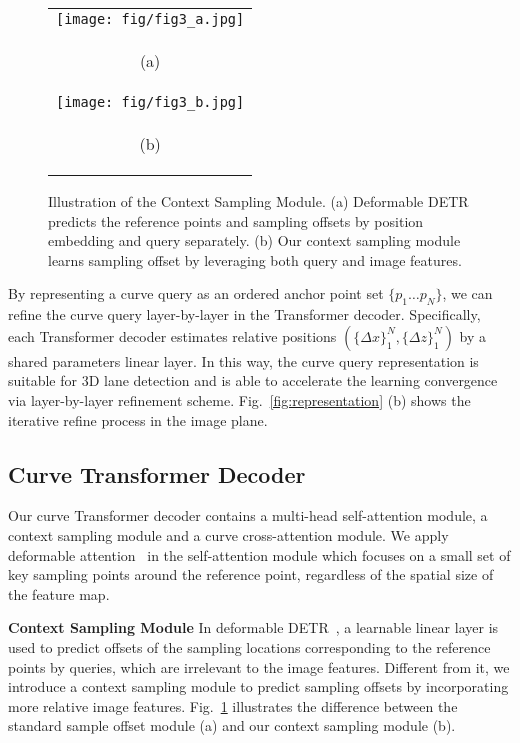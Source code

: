 \documentclass[letterpaper, 10 pt, conference]{ieeeconf}
\begin{document}
\begin{figure}[ht]
\centering
  \begin{tabular}{c}
   \texttt{[image: fig/fig3\_a.jpg]}\\
   \begin{scriptsize}  
   (a)
   \end{scriptsize} \\
   \texttt{[image: fig/fig3\_b.jpg]}\\
   \begin{scriptsize}  
   (b)
   \end{scriptsize}  \\
 \end{tabular}
\caption{Illustration of the Context Sampling Module. (a) Deformable DETR\cite{zhu2020deformable} predicts the reference points and sampling offsets by position embedding and query separately. (b) Our context sampling module learns sampling offset by leveraging both query and image features.}
\label{fig:context-sampling}
\end{figure}

By representing a curve query as an ordered anchor point set $\{p_1 \dots p_N\}$, we can refine the curve query layer-by-layer in the Transformer decoder. Specifically, each Transformer decoder estimates relative positions $(\{\Delta x\}_1^N, \{\Delta z\}_1^N)$ by a shared parameters linear layer. In this way, the curve query representation is suitable for 3D lane detection and is able to accelerate the learning convergence via layer-by-layer refinement scheme. Fig.~\ref{fig:representation} (b) shows the iterative refine process in the image plane.

\subsection{Curve Transformer Decoder}


Our curve Transformer decoder contains a multi-head self-attention module, a context sampling module and a curve cross-attention module. 
We apply deformable attention~\cite{zhu2020deformable} in the self-attention module which focuses on a small set of key sampling points around the reference point, regardless of the spatial size of the feature map.

\noindent\textbf{Context Sampling Module} In deformable DETR~\cite{zhu2020deformable}, a learnable linear layer is used to predict offsets of the sampling locations corresponding to the reference points by queries, which are irrelevant to the image features. 
Different from it, we introduce a context sampling module to predict sampling offsets by incorporating more relative image features.
Fig.~\ref{fig:context-sampling} illustrates the difference between the standard sample offset module (a) and our context sampling module (b). 
\end{document}
